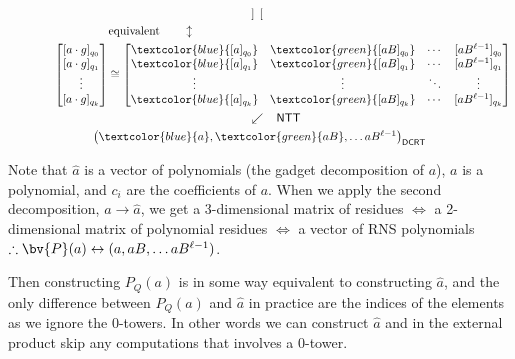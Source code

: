 \begin{gather*}
\begin{bmatrix}
\end{bmatrix}
\hspace{0.15cm}
\\
\text{equivalent}\quad\quad\updownarrow\hspace{6.6cm}
\\
\hspace{1.4cm}
\begin{bmatrix}
    [a\cdot g]_{q_0}\\ 
    [a\cdot g]_{q_1}\\
    \vdots \\
    [a\cdot g]_{q_k} \\
\end{bmatrix}
\cong
\begin{bmatrix} 
    \textcolor{blue}{[a]_{q_0}} & \textcolor{green}{[aB]_{q_0}} & \cdots & [aB^{\ell-1}]_{q_0} \\ 
    \textcolor{blue}{[a]_{q_1}} & \textcolor{green}{[aB]_{q_1}} & \cdots & [aB^{\ell-1}]_{q_1} \\
    \vdots & \vdots & \ddots & \vdots \\
    \textcolor{blue}{[a]_{q_k}} & \textcolor{green}{[aB]_{q_k}} & \cdots & [aB^{\ell-1}]_{q_k} \\
\end{bmatrix} 
\\
\hspace{1cm}\swarrow\hspace{.3cm}\mathsf{NTT} 
\\
\begin{pmatrix}
    \textcolor{blue}{a}, \textcolor{green}{aB}, \dots aB^{\ell-1}
\end{pmatrix}_\mathsf{DCRT}
\end{gather*}

Note that $\hat{a}$ is a vector of polynomials (the gadget decomposition of $a$), $a$ is a polynomial, and $c_i$ are the coefficients of $a$. When we apply the second decomposition, $a \to \hat{a}$, we get a 3-dimensional matrix of residues $\iff$ a 2-dimensional matrix of polynomial residues $\iff$ a vector of RNS polynomials $\therefore \bv{P}(a) \leftrightarrow (a, aB, \dots aB^{\ell-1})$.

Then constructing $P_Q(a)$ is in some way equivalent to constructing $\hat{a}$, and the only difference between $P_Q(a)$ and $\hat{a}$ in practice are the indices of the elements as we ignore the 0-towers. In other words we can construct $\hat{a}$ and in the external product skip any computations that involves a 0-tower.


